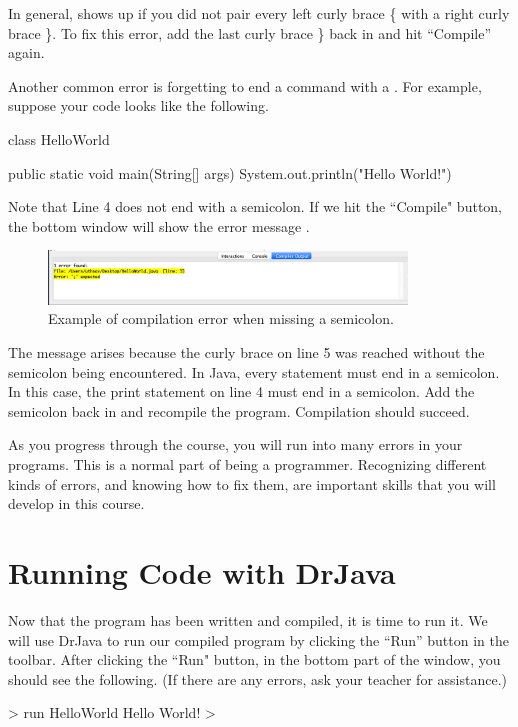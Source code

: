 In general,  shows up if you did not pair every left curly brace \{ with a right curly brace \}.
To fix this error, add the last curly brace \} back in and hit ``Compile'' again.

Another common error is forgetting to end a command with a \ic{;}. For example, suppose your code looks like the following.

\begin{code}
class HelloWorld {
    
    public static void main(String[] args) {
        System.out.println("Hello World!")
    }
}
\end{code}

Note that Line 4 does not end with a semicolon. If we hit the ``Compile" button, the bottom window will show the error message .

\begin{figure}[ht]
	\centering
	\includegraphics[width=0.85\textwidth]{images/hello_world_error2.png}
	\caption{Example of compilation error when missing a semicolon.}
	\label{fig:helloworld:sec:error2}
\end{figure}

The message  arises because the curly brace on line 5 was reached without the semicolon being
encountered. In Java, every statement must end in a semicolon. In this case, the print statement on line 4 must
end in a semicolon. Add the semicolon back in and recompile the program. Compilation should succeed.

As you progress through the course, you will run into many errors in your programs. This is a normal part of being a programmer. Recognizing different kinds of errors, and knowing how to fix them, are important skills that you will develop in this course.

\section{Running Code with DrJava}
Now that the program has been written and compiled, it is time to run it.
We will use DrJava to run our compiled program by clicking the ``Run'' button in the toolbar. After clicking the ``Run" button, in the bottom part of the window, you should see the following. (If there are any errors, ask your teacher for assistance.)
\begin{code}
> run HelloWorld
Hello World!
>
\end{code}

